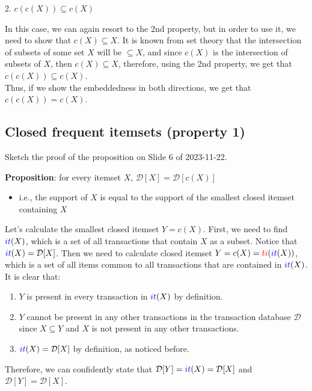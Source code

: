 \documentclass{article}
\newcommand{\Ti}{\textcolor{red}{ti}}
\newcommand{\It}{\textcolor{blue}{it}}
\begin{document}
\begin{enumerate}
    2. $c(c(X)) \subseteq c(X)$

    In this case, we can again resort to the 2nd property, but in order to use it, we need to show that $c(X) \subseteq X$. It is known from set theory that the intersection of subsets of some set $X$ will be $\subseteq X$, and since $c(X)$ is the intersection of subsets of $X$, then $c(X) \subseteq X$, therefore, using the 2nd property, we get that $c(c(X)) \subseteq c(X)$. \\

    Thus, if we show the embeddedness in both directions, we get that $c(c(X)) = c(X)$.

  \end{enumerate}

  \subsection{Closed frequent itemsets (property 1)}
  \begin{centerframebox}
    Sketch the proof of the proposition on Slide 6 of 2023-11-22.

    \textbf{Proposition}: for every itemset $X$, $\mathcal{D}[X] = \mathcal{D}[c(X)]$
    \begin{itemize}
      \item i.e., the support of $X$ is equal to the support of the smallest closed itemset containing $X$
    \end{itemize}
  \end{centerframebox}

  Let's calculate the smallest closed itemset $Y = c(X)$.
  First, we need to find $\It(X)$, which is a set of all transactions that contain $X$ as a subset.
  Notice that $\It(X) = \mathcal{D}[X]$.
  Then we need to calculate closed itemset $Y = c(X) = \Ti(\It(X))$, which is a set of all items common to all transactions that are contained in $\It(X)$. It is clear that:
  \begin{enumerate}[label=\arabic*)]
    \item $Y$ is present in every transaction in $\It(X)$ by definition.
    \item $Y$ cannot be present in any other transactions in the transaction database $\mathcal{D}$ since $X \subseteq Y$
    and $X$ is not present in any other transactions.
    \item $\It(X) = \mathcal{D}[X]$ by definition, as noticed before.
  \end{enumerate}
  Therefore, we can confidently state that $\mathcal{D}[Y] = \It(X) = \mathcal{D}[X]$ and $\mathcal{D}[Y] = \mathcal{D}[X]$.
\end{document}

